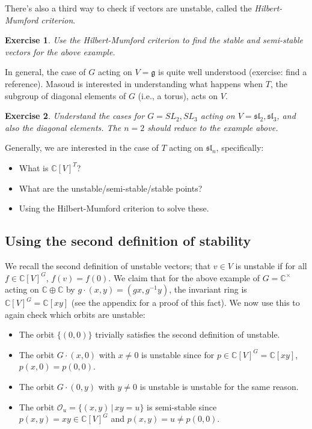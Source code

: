 \documentclass[12pt]{amsart}
\newcommand{\C}{\mathbb{C}}
\newtheorem*{exercise}{Exercise}
\theoremstyle{remark}
\theoremstyle{remark}
\begin{document}
There's also a third way to check if vectors are unstable, called the \emph{Hilbert-Mumford criterion}.

\begin{exercise}
Use the Hilbert-Mumford criterion to find the stable and semi-stable vectors for the above example.
\end{exercise}

In general, the case of $G$ acting on $V = \mathfrak{g}$ is quite well understood (exercise: find a reference).
Masoud is interested in understanding what happens when $T$, the subgroup of diagonal elements of $G$ (i.e., a torus), acts on $V$.

\begin{exercise}
Understand the cases for $G = SL_2, SL_3$ acting on $V = \mathfrak{sl_2}, \mathfrak{sl_3}$, and \emph{also the diagonal elements}.
The $n=2$ should reduce to the example above.
\end{exercise}

Generally, we are interested in the case of $T$ acting on $\mathfrak{sl}_n$, specifically:
\begin{itemize}[label=-]
\item
What is $\mathbb{C}[V]^T$?

\item
What are the unstable/semi-stable/stable points?

\item
Using the Hilbert-Mumford criterion to solve these.
\end{itemize}

\newpage
\subsection*{Using the second definition of stability}
We recall the second definition of unstable vectors; that $v \in V$ is unstable if for all $f \in \C[V]^G$, $f(v) = f(0)$.
We claim that for the above example of $G = \C^\times$ acting on $\C \oplus \C$ by $g \cdot (x, y) = (gx, g^{-1}y)$, the invariant ring is $\C[V]^G = \C[xy]$ (see the appendix for a proof of this fact).
We now use this to again check which orbits are unstable:
\begin{itemize}[label=-]
\item
The orbit $\{(0, 0)\}$ trivially satisfies the second definition of unstable.

\item
The orbit $G \cdot (x, 0)$ with $x \ne 0$ is unstable since for $p \in \C[V]^G = \C[xy]$, $p(x, 0) = p(0, 0)$.

\item
The orbit $G \cdot (0, y)$ with $y \ne 0$ is unstable is unstable for the same reason.

\item 
The orbit $\mathcal{O}_u = \{(x, y) \, | \, xy = u\}$ is semi-stable since $p(x, y) = xy \in \C[V]^G$ and $p(x, y) = u \ne p(0,0)$.
\end{itemize}
\end{document}
